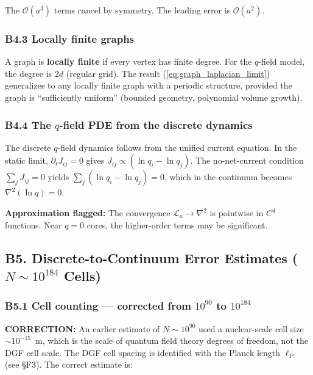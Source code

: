 \documentclass[reprint]{revtex4-2}
\begin{document}
The $\mathcal{O}(a^3)$ terms cancel by symmetry. The leading error is $\mathcal{O}(a^2)$.

\subsubsection{B4.3 Locally finite graphs}

A graph is \textbf{locally finite} if every vertex has finite degree. For the $q$-field model, the degree is $2d$ (regular grid). The result (\ref{eq:graph_laplacian_limit}) generalizes to any locally finite graph with a periodic structure, provided the graph is ``sufficiently uniform'' (bounded geometry, polynomial volume growth).

\subsubsection{B4.4 The $q$-field PDE from the discrete dynamics}

The discrete $q$-field dynamics follows from the unified current equation. In the static limit, $\partial_t J_{ij}=0$ gives $J_{ij} \propto (\ln q_i - \ln q_j)$. The no-net-current condition $\sum_j J_{ij}=0$ yields $\sum_j (\ln q_i - \ln q_j) = 0$, which in the continuum becomes $\nabla^2(\ln q)=0$.

\textbf{Approximation flagged:} The convergence $\mathcal{L}_a \to \nabla^2$ is pointwise in $C^4$ functions. Near $q=0$ cores, the higher-order terms may be significant.

\subsection{B5. Discrete-to-Continuum Error Estimates ($N\sim 10^{184}$ Cells)}

\subsubsection{B5.1 Cell counting --- corrected from $10^{90}$ to $10^{184}$}

\textbf{CORRECTION:} An earlier estimate of $N\sim 10^{90}$ used a nuclear-scale cell size $\sim 10^{-15}$~m, which is the scale of quantum field theory degrees of freedom, not the DGF cell scale. The DGF cell spacing is identified with the Planck length $\ell_P$ (see \S F3). The correct estimate is:
\end{document}
